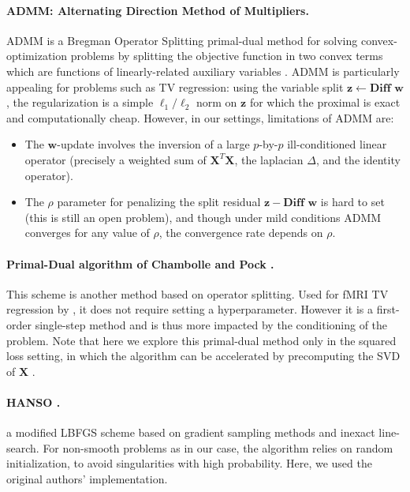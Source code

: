 \paragraph{ADMM: Alternating Direction Method of Multipliers.}
ADMM is a Bregman Operator Splitting primal-dual method for
solving convex-optimization problems by splitting the
objective function in two convex terms which are functions of linearly-related auxiliary variables
 \citep{boyd2010}.  ADMM is particularly appealing for problems such as TV
regression: using the variable split $\mathbf{z}
\leftarrow \textbf{Diff }\mathbf{w}$, the regularization is a simple $\ell_{1}/\ell_2$
norm on $\mathbf{z}$ for which the proximal is exact and computationally
cheap. However, in our settings, limitations of ADMM are:
\begin{itemize}
\item The $\mathbf{w}$-update involves the inversion of a large $p$-by-$p$
  ill-conditioned linear operator (precisely a weighted sum of
  $\mathbf{X}^T\mathbf{X}$, the laplacian $\Delta$, and the identity
  operator).
\item The $\rho$ parameter for penalizing the split
  residual $\mathbf{z} - \textbf{Diff }\mathbf{w}$ is hard to set (this is still an
  open problem), and though under mild conditions ADMM
  converges for any value of $\rho$, the convergence rate depends
  on $\rho$.
\end{itemize}

\paragraph{Primal-Dual algorithm of Chambolle and Pock  \citep{chambolle2010}.}
This scheme is another method based on operator splitting.
Used for fMRI TV regression by  \citep{gramfort-etal:2013a},
it does not require setting a hyperparameter.  %
However it is a first-order single-step method and is thus more impacted by the
conditioning of the problem. Note that here we explore this primal-dual
method only in the squared loss setting, in which the algorithm can be accelerated by
precomputing the SVD of $\mathbf{X}$  \citep{gramfort-etal:2013a}
.

\paragraph{HANSO  \citep{lewis2008}.}
a modified LBFGS scheme based on gradient 
sampling methods  \citep{burke2005} and inexact
line-search. For non-smooth problems as in our case, the algorithm relies on
random initialization, to avoid singularities with high probability. 
Here, we used the original authors' implementation.

